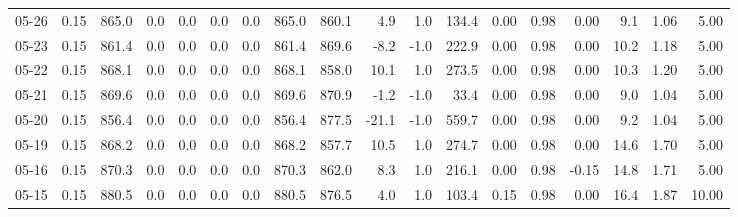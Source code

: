 \begin{threeparttable}
{\begin{tabular}{lrrrrrrrrrrrrrrrrr}
  05-26 &     0.15 & 865.0 &               0.0 &               0.0 &                0.0 &                0.0 & 865.0 & 860.1 &        4.9 &                      1.0 &               134.4 &       0.00 &      0.98 &           0.00 &              9.1 &            1.06 &                   5.00 \\
  05-23 &     0.15 & 861.4 &               0.0 &               0.0 &                0.0 &                0.0 & 861.4 & 869.6 &       -8.2 &                     -1.0 &               222.9 &       0.00 &      0.98 &           0.00 &             10.2 &            1.18 &                   5.00 \\
  05-22 &     0.15 & 868.1 &               0.0 &               0.0 &                0.0 &                0.0 & 868.1 & 858.0 &       10.1 &                      1.0 &               273.5 &       0.00 &      0.98 &           0.00 &             10.3 &            1.20 &                   5.00 \\
  05-21 &     0.15 & 869.6 &               0.0 &               0.0 &                0.0 &                0.0 & 869.6 & 870.9 &       -1.2 &                     -1.0 &                33.4 &       0.00 &      0.98 &           0.00 &              9.0 &            1.04 &                   5.00 \\
  05-20 &     0.15 & 856.4 &               0.0 &               0.0 &                0.0 &                0.0 & 856.4 & 877.5 &      -21.1 &                     -1.0 &               559.7 &       0.00 &      0.98 &           0.00 &              9.2 &            1.04 &                   5.00 \\
  05-19 &     0.15 & 868.2 &               0.0 &               0.0 &                0.0 &                0.0 & 868.2 & 857.7 &       10.5 &                      1.0 &               274.7 &       0.00 &      0.98 &           0.00 &             14.6 &            1.70 &                   5.00 \\
  05-16 &     0.15 & 870.3 &               0.0 &               0.0 &                0.0 &                0.0 & 870.3 & 862.0 &        8.3 &                      1.0 &               216.1 &       0.00 &      0.98 &          -0.15 &             14.8 &            1.71 &                   5.00 \\
  05-15 &     0.15 & 880.5 &               0.0 &               0.0 &                0.0 &                0.0 & 880.5 & 876.5 &        4.0 &                      1.0 &               103.4 &       0.15 &      0.98 &           0.00 &             16.4 &            1.87 &                  10.00 \\

\end{tabular}}
\end{threeparttable}
